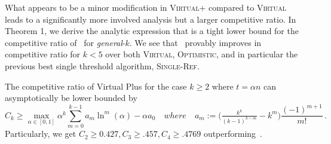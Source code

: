 What appears to be a minor modification in \textsc{Virtual+} compared to \textsc{Virtual} leads to a significantly more involved analysis but a larger competitive ratio. In Theorem 1, we derive the analytic expression that is a tight lower bound for the competitive ratio of \algoname\ for \emph{general}-$k$. We see that \algoname\ provably improves in competitive ratio for $k<5$ over both \textsc{Virtual}, \textsc{Optimistic}, and in particular the previous best single threshold algorithm, \textsc{Single-Ref}.

\begin{theorem}
The competitive ratio of Virtual Plus for the case $k \geq 2$ where $t = \alpha n$ can asymptotically be lower bounded by 
\begin{equation}
    C_k \geq  \max_{\alpha \in [0,1]}  {\alpha}^k \sum_{m = 0}^{k - 1} a_m \ln^m (\alpha)- \alpha a_0
    \quad where  \quad
    a_m := \big(\tfrac{k^k}{(k-1)^{k-m}} - k^m\big)\frac{(-1)^{m+1}}{m!}
    \, .
\end{equation}
Particularly, we get $C_2\geq0.427, C_3\geq .457, C_4\geq.4769$ outperforming~\citet{albers2020new}.
\label{thm:K_2_theorem1}
\end{theorem}

